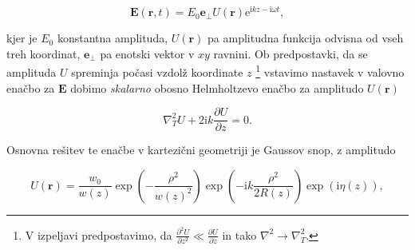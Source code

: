 \documentclass[longbibliography,slovene,a4paper,12pt]{book}
\newcommand{\E}{\text{e}}
\newcommand{\I}{\text{i}}
\begin{document}
\begin{equation}
\mathbf{E}(\mathbf{r}, t) = E_0 \mathbf{e_\perp}U(\mathbf{r}) \E^{\I kz - \I \omega t},
\label{gaussianansatz}
\end{equation}

kjer je $E_0$ konstantna amplituda, $U(\mathbf{r})$ pa amplitudna funkcija odvisna od vseh treh koordinat, $\mathbf{e_\perp}$ pa enotski vektor v $xy$ ravnini. Ob predpostavki, da se amplituda $U$ spreminja počasi vzdolž koordinate $z$ \footnote{V izpeljavi predpostavimo, da $\frac{\partial^2 U}{\partial z^2} \ll \frac{\partial U}{\partial z}$ in tako $\nabla^2 \rightarrow \nabla_T^2$.} vstavimo nastavek v valovno enačbo za $\mathbf{E}$ dobimo \emph{skalarno} obosno Helmholtzevo enačbo za amplitudo $U(\mathbf{r})$

\begin{equation}
\nabla_T^2 U + 2\I k \frac{\partial U}{\partial z} = 0.
\label{helmholtzequation}
\end{equation}

Osnovna rešitev te enačbe v kartezični geometriji je Gaussov snop, z amplitudo

\begin{equation}
U(\mathbf{r}) = \frac{w_0}{w(z)} \exp \left ( -\frac{\rho^2}{w(z)^2} \right ) \exp \left (-\I k \frac{\rho^2}{2R(z)} \right ) \exp(\I \eta(z)),
\label{gaussianamplitude}
\end{equation}
\end{document}
